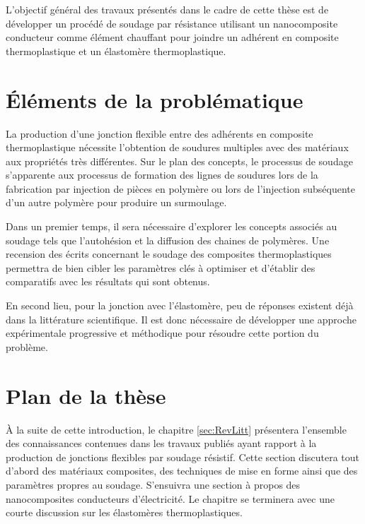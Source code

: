 L'objectif général des travaux présentés dans le cadre de cette thèse est de développer un procédé de soudage par résistance utilisant un nanocomposite conducteur comme élément chauffant pour joindre un adhérent en composite thermoplastique et un élastomère thermoplastique. 



\section{Éléments de la problématique}

La production d'une jonction flexible entre des adhérents en composite thermoplastique nécessite l'obtention de soudures multiples avec des matériaux aux propriétés très différentes. 
Sur le plan des concepts, le processus de soudage s'apparente aux processus de formation des lignes de soudures lors de la fabrication par injection de pièces en polymère ou lors de l'injection subséquente d'un autre polymère pour produire un surmoulage. 

Dans un premier temps, il sera nécessaire d'explorer les concepts associés au soudage tels que l'autohésion et la diffusion des chaines de polymères. 
Une recension des écrits concernant le soudage des composites thermoplastiques permettra de bien cibler les paramètres clés à optimiser et d'établir des comparatifs avec les résultats qui sont obtenus. 

En second lieu, pour la jonction avec l'élastomère, peu de réponses existent déjà dans la littérature scientifique.
Il est donc nécessaire de développer une approche expérimentale progressive et méthodique pour résoudre cette portion du problème. 

\section{Plan de la thèse}  %

À la suite de cette introduction, le chapitre \ref{sec:RevLitt} présentera l'ensemble des connaissances contenues dans les travaux publiés ayant rapport à la production de jonctions flexibles par soudage résistif. 
Cette section discutera tout d'abord des matériaux composites, des techniques de mise en forme ainsi que des paramètres propres au soudage. S'ensuivra une section à propos des nanocomposites conducteurs d'électricité. Le chapitre se terminera avec une courte discussion sur les élastomères thermoplastiques.


